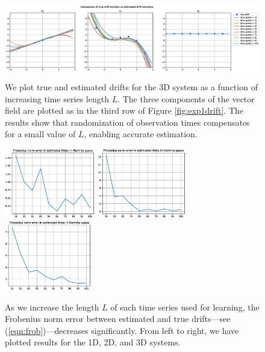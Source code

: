 \documentclass{article}
\begin{document}
\begin{figure}[th]
\begin{center}
\includegraphics[height=1.4in]{../3ddampedduffing/random_timepoints/plots/drift_comparison.eps}
\end{center}
\caption{We plot true and estimated drifts for the 3D system as a function of increasing time series length $L$.  The three components of the vector field are plotted as in the third row of Figure \ref{fig:exp1drift}.  The results show that randomization of observation times compensates for a small value of $L$, enabling accurate estimation.}
\label{fig:exp2drift}
\end{figure}

\begin{figure}[th]
\begin{center}
\includegraphics[height=1.2in]{../1dcode/random_timepoints/plots/hermite.eps}
\includegraphics[height=1.2in]{../2dcode/random_timepoints/plots/hermite.eps}
\includegraphics[height=1.2in]{../3ddampedduffing/random_timepoints/plots/hermite.eps}
\end{center}
\caption{As we increase the length $L$ of each time series used for learning, the Frobenius norm error between estimated and true drifts---see (\ref{eqn:frob})---decreases significantly.  From left to right, we have plotted results for the 1D, 2D, and 3D systems.}
\label{fig:exp2hermite}
\end{figure}
\end{document}
